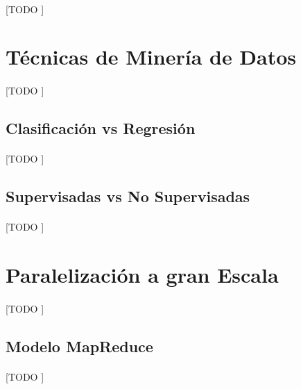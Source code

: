 \documentclass{article}
\begin{document}
    \paragraph{}
    [TODO ]

  \section{Técnicas de Minería de Datos}

    \paragraph{}
    [TODO ]

    \subsection{Clasificación vs Regresión}

      \paragraph{}
      [TODO ]

    \subsection{Supervisadas vs No Supervisadas}

      \paragraph{}
      [TODO ]


  \section{Paralelización a gran Escala}

    \paragraph{}
    [TODO ]

    \subsection{Modelo MapReduce}

      \paragraph{}
      [TODO ]
\end{document}
